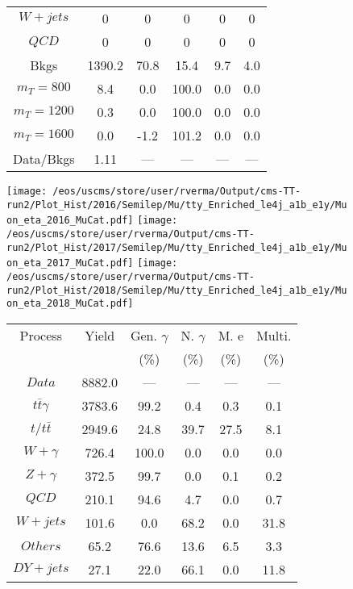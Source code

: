 \begin{figure}
\begin{minipage}[c]{0.32\textwidth}
{\begin{tabular}{cccccc}
$ W+jets $ &  0 &  0 &  0 &  0 &  0\\
$ QCD $ &  0 &  0 &  0 &  0 &  0\\
Bkgs &  1390.2 &  70.8 &  15.4 &  9.7 &  4.0\\
$ m_{T} = 800 $ &  8.4 &  0.0 &  100.0 &  0.0 &  0.0\\
$ m_{T} = 1200 $ &  0.3 &  0.0 &  100.0 &  0.0 &  0.0\\
$ m_{T} = 1600 $ &  0.0 &  -1.2 &  101.2 &  0.0 &  0.0\\
Data/Bkgs &  1.11 &  --- &  --- &  --- &  ---\\
\hline
\end{tabular}
}
\end{minipage}
\end{figure}

\begin{figure}
\centering
\texttt{[image: /eos/uscms/store/user/rverma/Output/cms-TT-run2/Plot\_Hist/2016/Semilep/Mu/tty\_Enriched\_le4j\_a1b\_e1y/Muon\_eta\_2016\_MuCat.pdf]}
\texttt{[image: /eos/uscms/store/user/rverma/Output/cms-TT-run2/Plot\_Hist/2017/Semilep/Mu/tty\_Enriched\_le4j\_a1b\_e1y/Muon\_eta\_2017\_MuCat.pdf]}
\texttt{[image: /eos/uscms/store/user/rverma/Output/cms-TT-run2/Plot\_Hist/2018/Semilep/Mu/tty\_Enriched\_le4j\_a1b\_e1y/Muon\_eta\_2018\_MuCat.pdf]}
\begin{minipage}[c]{0.32\textwidth}
\centering
\tiny{
\begin{tabular}{cccccc}
\hline
Process & Yield & Gen. $\gamma$ & N. $\gamma$ & M. e & Multi. \\
 &  & (\%) & (\%) & (\%) & (\%)  \\
\hline
                                                                      $ Data $ &  8882.0 &  --- &  --- &  --- &  ---\\
$ t\bar{t}\gamma $ &  3783.6 &  99.2 &  0.4 &  0.3 &  0.1\\
$ t/t\bar{t} $ &  2949.6 &  24.8 &  39.7 &  27.5 &  8.1\\
$ W+\gamma $ &  726.4 &  100.0 &  0.0 &  0.0 &  0.0\\
$ Z+\gamma $ &  372.5 &  99.7 &  0.0 &  0.1 &  0.2\\
$ QCD $ &  210.1 &  94.6 &  4.7 &  0.0 &  0.7\\
$ W+jets $ &  101.6 &  0.0 &  68.2 &  0.0 &  31.8\\
$ Others $ &  65.2 &  76.6 &  13.6 &  6.5 &  3.3\\
$ DY+jets $ &  27.1 &  22.0 &  66.1 &  0.0 &  11.8\\

\end{tabular}}
\end{minipage}
\end{figure}
